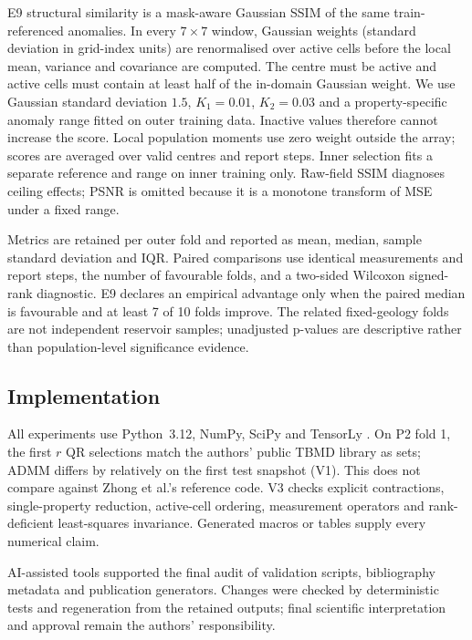 E9 structural similarity is a mask-aware Gaussian SSIM of the same train-referenced anomalies. In every $7\times7$ window, Gaussian weights (standard deviation in grid-index units) are renormalised over active cells before the local mean, variance and covariance are computed. The centre must be active and active cells must contain at least half of the in-domain Gaussian weight. We use Gaussian standard deviation $1.5$, $K_1=0.01$, $K_2=0.03$ and a property-specific anomaly range fitted on outer training data. Inactive values therefore cannot increase the score. Local population moments use zero weight outside the array; scores are averaged over valid centres and report steps. Inner selection fits a separate reference and range on inner training only. Raw-field SSIM diagnoses ceiling effects; PSNR is omitted because it is a monotone transform of MSE under a fixed range.

Metrics are retained per outer fold and reported as mean, median, sample standard deviation and IQR. Paired comparisons use identical measurements and report steps, the number of favourable folds, and a two-sided Wilcoxon signed-rank diagnostic. E9 declares an empirical advantage only when the paired median is favourable and at least 7 of 10 folds improve. The related fixed-geology folds are not independent reservoir samples; unadjusted p-values are descriptive rather than population-level significance evidence.

\subsection{Implementation}
\label{sec:implementation}
All experiments use Python~3.12, NumPy, SciPy and TensorLy \cite{harris2020numpy,virtanen2020scipy,kossaifi2019}. On P2 fold 1, the first $r$ QR selections match the authors' public TBMD library as sets; ADMM differs by \VerStateDiff{} relatively on the first test snapshot (V1). This does not compare against Zhong et al.'s reference code. V3 checks explicit contractions, single-property reduction, active-cell ordering, measurement operators and rank-deficient least-squares invariance. Generated macros or tables supply every numerical claim.

AI-assisted tools supported the final audit of validation scripts, bibliography metadata and publication generators. Changes were checked by deterministic tests and regeneration from the retained outputs; final scientific interpretation and approval remain the authors' responsibility.
